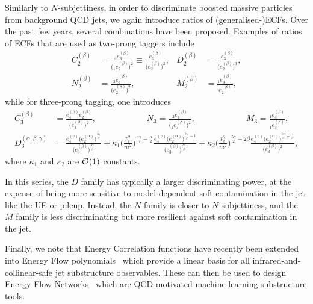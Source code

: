 Similarly to $N$-subjettiness, in order to discriminate boosted massive particles from background QCD jets,
we again introduce ratios of (generalised-)ECFs. Over the past few years,
several combinations have been proposed. Examples of ratios of ECFs that are used as two-prong taggers include
\begin{align}
  C_2^{(\beta)} &= \frac{{}_3e_3^{(\beta)}}{\big({}_1e_2^{(\beta)}\big)^2}
                  \equiv
                  \frac{e_3^{(\beta)}}{\big(e_2^{(\beta)}\big)^2},
                  &
  D_2^{(\beta)} &= \frac{e_3^{(\beta)}}{\big(e_2^{(\beta)}\big)^3},\\
  N_2^{(\beta)} &=  \frac{{}_2e_3^{(\beta)}}{\big(e_2^{(\beta)}\big)^2},
                  &
  M_2^{(\beta)} &= \frac{{}_1e_3^{(\beta)}}{e_2^{(\beta)}},\nonumber
\end{align}
while for three-prong tagging, one introduces~\cite{Larkoski:2013eya,Larkoski:2014zma,Moult:2016cvt}
\begin{align}
  C_3^{(\beta)} &= \frac{e_4^{(\beta)}e_2^{(\beta)}}{\big(e_3^{(\beta)}\big)^2},\qquad\qquad\qquad
  N_3 = \frac{{}_2e_4^{(\beta)}}{\big({}_1e_3^{(\beta)}\big)^2},\qquad\qquad\qquad
  M_3 = \frac{{}_1e_4^{(\beta)}}{{}_1e_3^{(\beta)}},\\
  D_3^{(\alpha,\beta,\gamma)}
    &=\frac{e_4^{(\gamma)}\big(e_2^{(\alpha)}\big)^{\frac{3\gamma}{\alpha}}}
           {\big(e_3^{(\beta)}\big)^{\frac{3\gamma}{\beta}}}
     +\kappa_1\Big(\frac{p_t^2}{m^2}\Big)^{\frac{\alpha\gamma}{\beta}-\frac{\alpha}{2}}
      \frac{e_4^{(\gamma)}\big(e_2^{(\alpha)}\big)^{\frac{2\gamma}{\beta}-1}}
           {\big(e_3^{(\beta)}\big)^{\frac{2\gamma}{\beta}}}
     +\kappa_2\Big(\frac{p_t^2}{m^2}\Big)^{\frac{5\gamma}{2}-2\beta}
      \frac{e_4^{(\gamma)}\big(e_2^{(\alpha)}\big)^{\frac{2\beta}{\alpha}-\frac{\gamma}{\alpha}}}
           {\big(e_3^{(\beta)}\big)^2},\nonumber
\end{align}
where $\kappa_1$ and $\kappa_2$ are ${\cal{O}}(1)$ constants.

In this series, the $D$ family has typically a larger
discriminating power, at the expense of being more sensitive to
model-dependent soft contamination in the jet like the UE
or pileup.
%
Instead, the $N$ family is closer to $N$-subjettiness, and the $M$
family is less discriminating but more resilient against soft
contamination in the jet.

Finally, we note that Energy Correlation functions have recently been
extended into Energy Flow polynomials~\cite{Komiske:2017aww} which
provide a linear basis for all infrared-and-collinear-safe jet
substructure observables. These can then be used to design Energy Flow
Networks~\cite{Komiske:2018cqr} which are QCD-motivated
machine-learning substructure tools.

